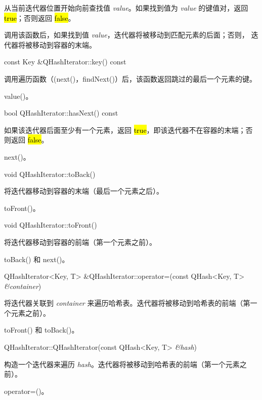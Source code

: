 从当前迭代器位置开始向前查找值 \emph{value}。如果找到值为 \emph{value} 的键值对，返回 \hl{true}；否则返回 \hl{false}。

调用该函数后，如果找到值 \emph{value}，迭代器将被移动到匹配元素的后面；否则，
迭代器将被移动到容器的末端。

const Key \&QHashIterator::key() const

调用遍历函数（(next()，findNext()）后，该函数返回跳过的最后一个元素的键。



\begin{notice}[另请参阅]
value()。
\end{notice}

bool QHashIterator::hasNext() const

如果该迭代器后面至少有一个元素，返回 \hl{true}，即该迭代器不在容器的末端；否则返回 \hl{false}。


\begin{notice}[另请参阅]
next()。
\end{notice}


void QHashIterator::toBack()

将迭代器移动到容器的末端（最后一个元素之后）。



\begin{notice}[另请参阅]
toFront()。
\end{notice}


void QHashIterator::toFront()

将迭代器移动到容器的前端（第一个元素之前）。




\begin{notice}[另请参阅]
toBack() 和 next()。
\end{notice}


QHashIterator<Key, T> \&QHashIterator::operator=(const QHash<Key, T> \emph{\&container})

将迭代器关联到 \emph{container} 来遍历哈希表。迭代器将被移动到哈希表的前端（第一个元素之前）。



\begin{notice}[另请参阅]
toFront() 和 toBack()。
\end{notice}


QHashIterator::QHashIterator(const QHash<Key, T> \emph{\&hash})

构造一个迭代器来遍历 \emph{hash}。迭代器将被移动到哈希表的前端（第一个元素之前）。


\begin{notice}[另请参阅]
operator=()。
\end{notice}


